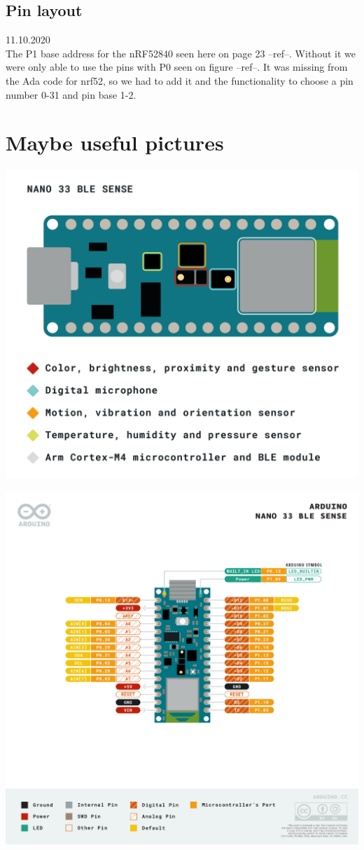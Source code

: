 \documentclass{article}
\begin{document}
\subsection{Pin layout}
11.10.2020\\
The P1 base address for the nRF52840 seen here on page 23 --ref--. Without it we were only able to use the pins with P0 seen on figure --ref--. It was missing from the Ada code for nrf52, so we had to add it and the functionality to choose a pin number 0-31 and pin base 1-2.


\newpage
\section{Maybe useful pictures}

\includegraphics[width=\linewidth]{img/NANO-33-BLE-Sense_sensor-indentification.png}

\includegraphics[width=\linewidth]{img/Pinout-NANOsense_latest.png}
\end{document}
